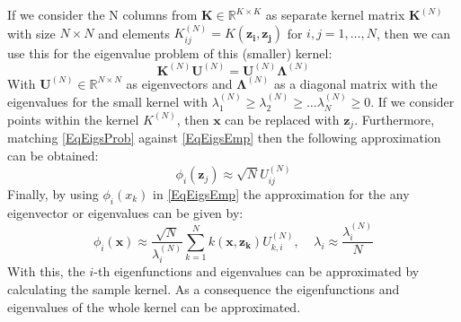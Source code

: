 If we consider the N columns from $\mathbf{K} \in \mathbb{R}^{K\times K}$ as separate kernel matrix $\mathbf{K}^{(N)}$ with size $N\times N$ and elements $K_{ij}^{(N)}=K(\mathbf{z_i,z_j})$ for $i,j=1,\dots,N$, then we can use this for the eigenvalue problem of this (smaller) kernel:\cite{Williams.2000}
\begin{equation}\label{EqEigsProb}
	\mathbf{K}^{(N)}\mathbf{U}^{(N)} = \mathbf{U}^{(N)}\mathbf{\Lambda}^{(N)}
\end{equation} 
With $\mathbf{U}^{(N)} \in \mathbb{R}^{N\times N}$ as eigenvectors and $\boldsymbol{\Lambda}^{(N)}$ as a diagonal matrix with the eigenvalues for the small kernel with $\lambda_1^{(N)}\ge\lambda_2^{(N)}\ge\dots\lambda_N^{(N)} \ge0$.
If we consider points within the kernel $K^{(N)}$, then $\mathbf{x}$ can be replaced with $\mathbf{z}_j$.
Furthermore, matching \eqref{EqEigsProb} against \eqref{EqEigsEmp} then the following approximation can be obtained:\cite{Williams.2000}
\begin{equation}\label{EqEigsFuncAprox}
	\phi_i(\mathbf{z}_j) \approx \sqrt{N}U_{ij}^{(N)}
\end{equation}
Finally, by using $\phi_i(x_k)$ in \eqref{EqEigsEmp} the approximation for the any eigenvector or eigenvalues can be given by:
\begin{equation}\label{EqEigsValAprox}
	\phi_i(\mathbf{x})\approx\frac{\sqrt{N}}{\lambda_i^{(N)}}\sum_{k=1}^{N}k(\mathbf{x},\mathbf{z_k})U_{k,i}^{(N)}, \>\>\>\>\> \lambda_i \approx \frac{\lambda_i^{(N)}}{N}
\end{equation}
With this, the $i$-th eigenfunctions and eigenvalues can be approximated by calculating the sample kernel.\cite{Williams.2000}
As a consequence the eigenfunctions and eigenvalues of the whole kernel can be approximated.
